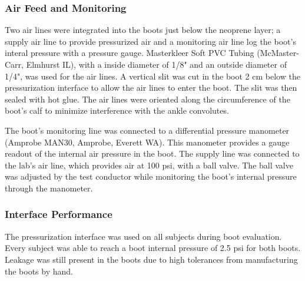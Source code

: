 \documentclass[defaultstyle,11pt]{thesis}
\providecommand{\DIFaddbegin}{} %
\providecommand{\DIFaddend}{} %
\providecommand{\DIFdelbegin}{} %
\providecommand{\DIFdelend}{} %
\newcommand{\DIFscaledelfig}{0.5}
\newlength{\DIFdelgraphicswidth} %
\newlength{\DIFdelgraphicsheight} %
\newcommand{\DIFaddincludegraphics}[2][]{{\color{blue}\fbox{\DIFOincludegraphics[#1]{#2}}}} %
\newcommand{\DIFdelincludegraphics}[2][]{%
\sbox{\DIFdelgraphicsbox}{\DIFOincludegraphics[#1]{#2}}%
\settoboxwidth{\DIFdelgraphicswidth}{\DIFdelgraphicsbox} %
\settoboxtotalheight{\DIFdelgraphicsheight}{\DIFdelgraphicsbox} %
\scalebox{\DIFscaledelfig}{%
\parbox[b]{\DIFdelgraphicswidth}{\usebox{\DIFdelgraphicsbox}\\[-\baselineskip] \rule{\DIFdelgraphicswidth}{0em}}\llap{\resizebox{\DIFdelgraphicswidth}{\DIFdelgraphicsheight}{%
\setlength{\unitlength}{\DIFdelgraphicswidth}%
\begin{picture}(1,1)%
\thicklines\linethickness{2pt} %
{\color[rgb]{1,0,0}\put(0,0){\framebox(1,1){}}}%
{\color[rgb]{1,0,0}\put(0,0){\line( 1,1){1}}}%
{\color[rgb]{1,0,0}\put(0,1){\line(1,-1){1}}}%
\end{picture}%
}\hspace*{3pt}}} %
} %
\DeclareRobustCommand{\DIFaddbegin}{\DIFOaddbegin \let\includegraphics\DIFaddincludegraphics} %
\DeclareRobustCommand{\DIFaddend}{\DIFOaddend \let\includegraphics\DIFOincludegraphics} %
\DeclareRobustCommand{\DIFdelbegin}{\DIFOdelbegin \let\includegraphics\DIFdelincludegraphics} %
\DeclareRobustCommand{\DIFdelend}{\DIFOaddend \let\includegraphics\DIFOincludegraphics} %
\begin{document}
\DIFdelbegin %
\DIFdelend \DIFaddbegin \hypertarget{air-feed-and-monitoring}{%
\subsubsection{Air Feed and Monitoring}\label{air-feed-and-monitoring}}
\DIFaddend 

Two air lines were integrated into the boots just below the neoprene layer; a supply air line to provide pressurized air and a monitoring air line log the boot's interal pressure with a pressure gauge.
Masterkleer Soft PVC Tubing (McMaster-Carr, Elmhurst IL), with a inside diameter of 1/8" and an outside diameter of 1/4", was used for the air lines.
A vertical slit was cut in the boot 2 cm below the pressurization interface to allow the air lines to enter the boot.
The slit was then sealed with hot glue.
The air lines were oriented along the circumference of the boot's calf to minimize interference with the ankle convolutes.

The boot's monitoring line was connected to a differential pressure manometer (Amprobe MAN30, Amprobe, Everett WA).
This manometer provides a gauge readout of the internal air pressure in the boot.
The supply line was connected to the lab's air line, which provides air at 100 psi, with a ball valve.
The ball valve was adjusted by the test conductor while monitoring the boot's internal pressure through the manometer.

\DIFdelbegin %
\DIFdelend \DIFaddbegin \hypertarget{interface-performance}{%
\subsubsection{Interface Performance}\label{interface-performance}}
\DIFaddend 

The pressurization interface was used on all subjects during boot evaluation.
Every subject was able to reach a boot internal pressure of 2.5 psi for both boots.
Leakage was still present in the boots due to high tolerances from manufacturing the boots by hand.
\end{document}

